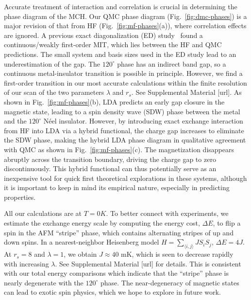 \documentclass[aps,prb,showpacs,preprintnumbers,amsmath,amssymb,superscriptaddress,twocolumn]{revtex4-1}
\begin{document}
Accurate treatment of interaction and correlation is crucial in determining the phase diagram of the MCH.
Our QMC phase diagram (Fig.~\ref{fig:dmc-phases}) is a major revision of that from HF (Fig.~\ref{fig:mf-phases}(a)), where correlation effects are ignored.
A previous exact diagonalization (ED) study~\cite{Morales-Duran2021} found a continuous/weakly first-order MIT, which lies between the HF and QMC predictions.
The small system and basis sizes used in the ED study lead to an underestimation of the gap.
The $120^\circ$ phase has an indirect band gap, so a continuous metal-insulator transition is possible in principle.
However, we find a first-order transition in our most accurate calculations within the finite resolution of
our scan of the two parameters $\lambda$ and $r_s$.
See Supplemental Material [url].
As shown in Fig.~\ref{fig:mf-phases}(b), LDA predicts an early gap closure in the magnetic state, leading to a spin density wave (SDW) phase between the metal and the $120^\circ$ N\'eel insulator.
However, by introducing exact exchange interaction from HF into LDA via a hybrid functional, the charge gap increases to eliminate the SDW phase, making the hybrid LDA phase diagram in qualitative agreement with QMC as shown in Fig.~\ref{fig:mf-phases}(c).
The magnetization disappears abruptly across the transition boundary, driving the charge gap to zero discontinuously.
This hybrid functional can thus potentially serve as an inexpensive
tool for quick first theoretical explorations in these systems,
although it is important to keep in mind its empirical nature,
especially in predicting properties.

All our calculations are at $T=0K$.
To better connect with experiments, we estimate the exchange energy scale by computing the energy cost, $\Delta E$,
to flip a spin in the AFM ``stripe'' phase, which contains alternating stripes of up and down spins.
In a nearest-neighbor Heisenberg model $H=\sum_{\langle i, j\rangle} J S_i S_j$, $\Delta E=4J$.
At $r_s=8$ and $\lambda=1$, we obtain $J \approx 40$ mK,
which is seen to decrease rapidly with increasing $\lambda$.
See Supplemental Material [url] for details.
This is consistent with our total energy comparisons which indicate that the ``stripe'' phase is nearly degenerate with the $120^\circ$ phase.
The near-degeneracy of magnetic states can lead to exotic spin physics, which we hope to explore in future work.
\end{document}
